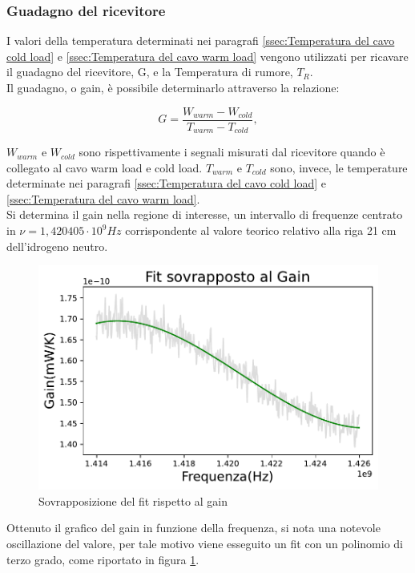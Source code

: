 \subsubsection{Guadagno del ricevitore}
\label{ssec:Guadagno del ricevitore}

I valori della temperatura determinati nei paragrafi \ref{ssec:Temperatura del cavo cold load} e  \ref{ssec:Temperatura del cavo warm load}  vengono utilizzati per ricavare il guadagno del ricevitore, G, e la Temperatura di rumore, $T_{R}$.\\
Il guadagno, o gain, è possibile determinarlo attraverso la relazione:

\begin{equation}
G = \dfrac{W_{warm}-W_{cold}}{T_{warm}-T_{cold}},
\label{Formula gain}
\end{equation}

$W_{warm}$ e $W_{cold}$ sono rispettivamente i segnali misurati dal ricevitore quando è collegato al cavo warm load e cold load.
$T_{warm}$ e $T_{cold}$ sono, invece, le temperature determinate nei paragrafi \ref{ssec:Temperatura del cavo cold load} e  \ref{ssec:Temperatura del cavo warm load}.\\
Si determina il gain nella regione di interesse, un intervallo di frequenze centrato in $\nu = 1,420405 \cdot  10^{9} Hz$ corrispondente al valore teorico relativo alla riga 21 cm dell'idrogeno neutro.

\begin{figure}[H]
	\centering
	\includegraphics[scale=0.8]{Fit_Gain.pdf}
	\caption{Sovrapposizione del fit rispetto al gain}
    	\label{fig:Fit_Gain}
\end{figure}

Ottenuto il grafico del gain in funzione della frequenza, si nota una notevole oscillazione del valore, per tale motivo viene esseguito un fit con un polinomio di terzo grado, come riportato in figura \ref{fig:Fit_Gain}.

